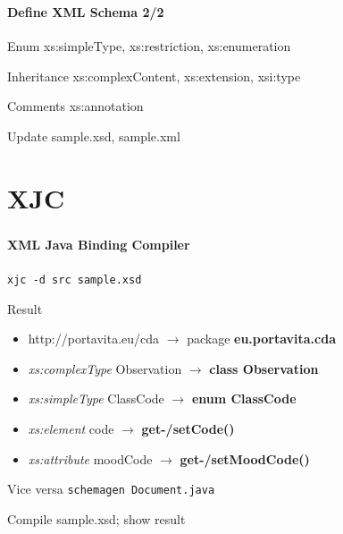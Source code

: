 \documentclass[handout]{beamer}
\begin{document}
\begin{frame}
	\frametitle{\insertsection}
	\framesubtitle{Define XML Schema 2/2}
	\begin{block}{Enum}
		xs:simpleType,
		xs:restriction,
		xs:enumeration
	\end{block}
	\begin{block}{Inheritance}
		xs:complexContent,
		xs:extension,
		xsi:type
	\end{block}
	\begin{block}{Comments}
		xs:annotation
	\end{block}
	\begin{semiverbatim}
		Update sample.xsd, sample.xml
	\end{semiverbatim}
\end{frame}

\section{XJC}
\begin{frame}
	\frametitle{\insertsection}
	\framesubtitle{XML Java Binding Compiler}
	\begin{example}
		\texttt{xjc -d src sample.xsd}
	\end{example}
	\begin{block}{Result}
		\begin{itemize}
			\item http://portavita.eu/cda $\rightarrow$ package \textbf{eu.portavita.cda} \\
			\item \emph{xs:complexType} Observation $\rightarrow$ \textbf{class Observation} \\
			\item \emph{xs:simpleType} ClassCode $\rightarrow$ \textbf{enum ClassCode} \\
			\item \emph{xs:element} code $\rightarrow$ \textbf{get-/setCode()} \\
			\item \emph{xs:attribute} moodCode $\rightarrow$ \textbf{get-/setMoodCode()} \\
		\end{itemize}
	\end{block}
	\begin{block}{Vice versa}
		\texttt{schemagen Document.java}
	\end{block}
	\begin{semiverbatim}
		Compile sample.xsd; show result
	\end{semiverbatim}
\end{frame}
\end{document}
